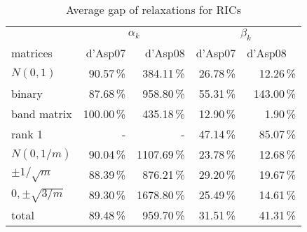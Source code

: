 \begin{table} 
 \begin{scriptsize} \caption{Average gap of relaxations for RICs} 
 \label{lhsRhsGap} 
 \begin{tabular*}{\linewidth}{@{}l@{\;\;\extracolsep{\fill}}rrrr@{}}\toprule 
  & \multicolumn{2}{c}{$\alpha_k$} & \multicolumn{2}{c}{$\beta_k$} \\ 
\cmidrule(r){2-3} \cmidrule(l){4-5} 
matrices & d'Asp07 & d'Asp08 & d'Asp07 & d'Asp08 \ 
\\ \midrule 
$N(0,1)$ & \num{90.57}\,\% & \num{384.11}\,\% & \num{26.78}\,\% & \num{12.26}\,\% \\ 
binary & \num{87.68}\,\% & \num{958.80}\,\% & \num{55.31}\,\% & \num{143.00}\,\% \\ 
band matrix & \num{100.00}\,\% & \num{435.18}\,\% & \num{12.90}\,\% & \num{1.90}\,\% \\ 
rank 1& - &- & \num{47.14}\,\% & \num{85.07}\,\% \\ 
$N(0,1/m)$ & \num{90.04}\,\% & \num{1107.69}\,\% & \num{23.78}\,\% & \num{12.68}\,\% \\ 
$\pm 1/\sqrt{m}$ & \num{88.39}\,\% & \num{876.21}\,\% & \num{29.20}\,\% & \num{19.67}\,\% \\ 
$0, \pm \sqrt{3/m}$ & \num{89.30}\,\% & \num{1678.80}\,\% & \num{25.49}\,\% & \num{14.61}\,\% \\ 
\midrule 
total &  \num{89.48}\,\% & \num{959.70}\,\% & \num{31.51}\,\% & \num{41.31}\,\%\\ 
\bottomrule 
 \end{tabular*} 
 \end{scriptsize} 
 \end{table} 